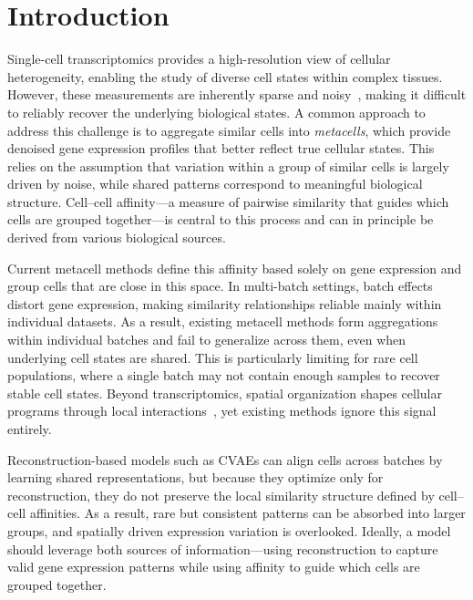 \section{Introduction}

Single-cell transcriptomics provides a high-resolution view of cellular heterogeneity, enabling the study of diverse cell states within complex tissues. However, these measurements are inherently sparse and noisy~\citep{luecken2019current}, making it difficult to reliably recover the underlying biological states. A common approach to address this challenge is to aggregate similar cells into \emph{metacells}, which provide denoised gene expression profiles that better reflect true cellular states. This relies on the assumption that variation within a group of similar cells is largely driven by noise, while shared patterns correspond to meaningful biological structure. Cell--cell affinity---a measure of pairwise similarity that guides which cells are grouped together---is central to this process and can in principle be derived from various biological sources.

Current metacell methods define this affinity based solely on gene expression and group cells that are close in this space. In multi-batch settings, batch effects distort gene expression, making similarity relationships reliable mainly within individual datasets. As a result, existing metacell methods form aggregations within individual batches and fail to generalize across them, even when underlying cell states are shared. This is particularly limiting for rare cell populations, where a single batch may not contain enough samples to recover stable cell states. Beyond transcriptomics, spatial organization shapes cellular programs through local interactions~\citep{nichenet, cellchat, mecell}, yet existing methods ignore this signal entirely.

Reconstruction-based models such as CVAEs can align cells across batches by learning shared representations, but because they optimize only for reconstruction, they do not preserve the local similarity structure defined by cell--cell affinities. As a result, rare but consistent patterns can be absorbed into larger groups, and spatially driven expression variation is overlooked. Ideally, a model should leverage both sources of information---using reconstruction to capture valid gene expression patterns while using affinity to guide which cells are grouped together.

